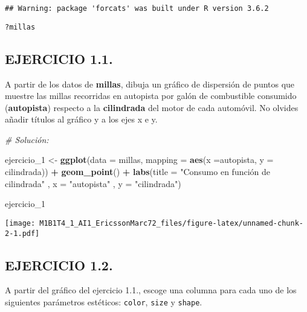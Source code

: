 \documentclass[]{article}
\newenvironment{Shaded}{\begin{snugshade}}{\end{snugshade}}
\newcommand{\CommentTok}[1]{\textcolor[rgb]{0.56,0.35,0.01}{\textit{#1}}}
\newcommand{\DataTypeTok}[1]{\textcolor[rgb]{0.13,0.29,0.53}{#1}}
\newcommand{\DecValTok}[1]{\textcolor[rgb]{0.00,0.00,0.81}{#1}}
\newcommand{\KeywordTok}[1]{\textcolor[rgb]{0.13,0.29,0.53}{\textbf{#1}}}
\newcommand{\NormalTok}[1]{#1}
\newcommand{\OperatorTok}[1]{\textcolor[rgb]{0.81,0.36,0.00}{\textbf{#1}}}
\newcommand{\StringTok}[1]{\textcolor[rgb]{0.31,0.60,0.02}{#1}}
\begin{document}
\begin{verbatim}
## Warning: package 'forcats' was built under R version 3.6.2
\end{verbatim}

\begin{verbatim}
?millas
\end{verbatim}

\hypertarget{ejercicio-1.1.}{%
\subsection{EJERCICIO 1.1.}\label{ejercicio-1.1.}}

A partir de los datos de \textbf{millas}, dibuja un gráfico de
dispersión de puntos que muestre las millas recorridas en autopista por
galón de combustible consumido (\textbf{autopista}) respecto a la
\textbf{cilindrada} del motor de cada automóvil. No olvides añadir
títulos al gráfico y a los ejes x e y.

\begin{Shaded}
\begin{Highlighting}[]
\CommentTok{# Solución:}

\NormalTok{ejercicio_}\DecValTok{1}\NormalTok{ <-}\StringTok{ }\KeywordTok{ggplot}\NormalTok{(}\DataTypeTok{data =}\NormalTok{ millas, }\DataTypeTok{mapping =} \KeywordTok{aes}\NormalTok{(}\DataTypeTok{x =}\NormalTok{autopista, }\DataTypeTok{y =}\NormalTok{ cilindrada)) }\OperatorTok{+}\StringTok{ }
\StringTok{  }\KeywordTok{geom_point}\NormalTok{() }\OperatorTok{+}
\StringTok{  }\KeywordTok{labs}\NormalTok{(}\DataTypeTok{title =} \StringTok{"Consumo en función de cilindrada"}
\NormalTok{       , }\DataTypeTok{x =} \StringTok{"autopista"}
\NormalTok{       , }\DataTypeTok{y =} \StringTok{"cilindrada"}\NormalTok{)}
  
\NormalTok{ejercicio_}\DecValTok{1}
\end{Highlighting}
\end{Shaded}

\texttt{[image: M1B1T4\_1\_AI1\_EricssonMarc72\_files/figure-latex/unnamed-chunk-2-1.pdf]}

\hypertarget{ejercicio-1.2.}{%
\subsection{EJERCICIO 1.2.}\label{ejercicio-1.2.}}

A partir del gráfico del ejercicio 1.1., escoge una columna para cada
uno de los siguientes parámetros estéticos: \texttt{color},
\texttt{size} y \texttt{shape}.
\end{document}
